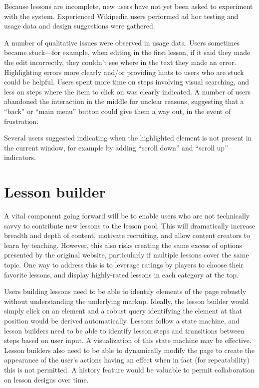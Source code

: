 \documentclass{acm_proc_article-sp}
\begin{document}
Because lessons are incomplete, new users have not yet been asked to
experiment with the system. Experienced Wikipedia users performed 
ad hoc testing and usage data and design suggestions were gathered.

A number of qualitative issues were observed in usage data. Users
sometimes became stuck---for example, when editing in the first lesson,
if it said they made the edit incorrectly, they couldn't see where in the text
they made an error. Highlighting errors more clearly and/or providing
hints to users who are stuck could be helpful. Users spent more time
on steps involving visual searching, and less on steps where the item
to click on was clearly indicated. A number of users
abandoned the interaction in the middle for unclear reasons, suggesting that a ``back'' or
``main menu'' button could give them a way out, in the event of frustration.

Several users suggested indicating when the
highlighted element is not present in the current window, for example by
adding ``scroll down'' and ``scroll up'' indicators. 

\section{Lesson builder}
\label{sec:lessonbuilder}

A vital component going forward will be to enable users who are not technically savvy to contribute new lessons to the lesson pool. This will dramatically increase breadth and depth of content, motivate recruiting, and allow content creators to learn by teaching. However, this also risks creating the same excess of options presented by the original website, particularly if multiple lessons cover the same topic. One way to address this is to leverage ratings by players to choose their favorite lessons, and display highly-rated lessons in each category at the top.

Users building lessons need to be able to identify elements of the page robustly without understanding the underlying markup. Ideally, the lesson builder would simply click on an element and a robust query identifying the element at that position would be derived automatically. Lessons follow a state machine, and lesson builders need to be able to identify lesson steps and transitions between steps based on user input. A visualization of this state machine may be effective. Lesson builders also need to be able to dynamically modify the page to create the appearance of the user's actions having an effect when in fact (for repeatability) this is not permitted. A history feature would be valuable to permit collaboration on lesson designs over time.
\end{document}
